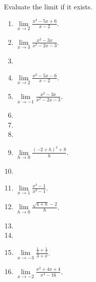 Evaluate the limit if it exists.
\begin{multicols}{2}
\begin{enumerate}[ref={\fcProblemRef}]
\item \label{problemlim(xto2)(x^2-5x+6)/(x-2)}
$\displaystyle\lim\limits_{x\to 2}\frac{x^2-5x+6}{x-2} $. 

\item $\displaystyle\lim\limits_{x\to 3}\frac{x^2-3x}{x^2-2x-3} $.

\item 
\item $\displaystyle\lim\limits_{x\to 2}\frac{x^2-5x-6}{x-2} $.

\item $\displaystyle\lim\limits_{x\to -1}\frac{x^2-3x}{x^{2}-2x-3} $.


\item 
\item 
\item 
\item $\displaystyle\lim\limits_{h\to 0}\frac{(-2+h)^3+8}{h} $.

\item 
\item $\displaystyle\lim\limits_{x\to 1}\frac{x^4-1}{x^3-1} $.

\item $\displaystyle\lim\limits_{h\to 0}\frac{\sqrt{4+h}-2}{h} $.

\item 
\item 
\item $\displaystyle\lim\limits_{x\to -3} \frac{\frac{1}{3}+ \frac{1}{x}} {3+x}$.

\item $\displaystyle\lim\limits_{x\to -2} \frac{x^2+4x+4}{x^4-16}$.


\end{enumerate}
\end{multicols}
